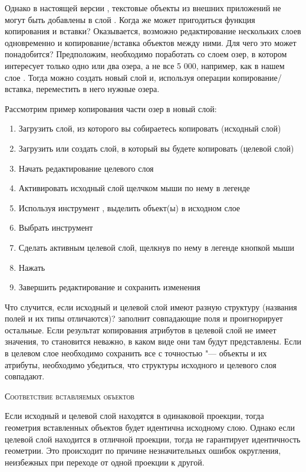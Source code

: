 Однако в настоящей версии  \qg, текстовые объекты из внешних приложений
\qg не могут быть добавлены в слой \qg. Когда же может пригодиться функция
копирования и вставки? Оказывается, возможно редактирование нескольких
слоев одновременно и копирование/вставка объектов между ними. Для чего это
может понадобится? Предположим, необходимо поработать со слоем озер, в
котором интересует только одно или два озера, а не все 5 000, например,
как в нашем слое . Тогда можно создать новый слой и,
используя операции копирование/вставка, переместить в него нужные озера.

Рассмотрим пример копирования части озер в новый слой:

\begin{enumerate}
\item Загрузить слой, из которого вы собираетесь копировать (исходный слой)
\item Загрузить или создать слой, в который вы будете копировать (целевой слой)
\item Начать редактирование целевого слоя
\item Активировать исходный слой щелчком мыши по нему в легенде
\item Используя инструмент ,
выделить объект(ы) в исходном слое
\item Выбрать инструмент 
\item Сделать активным целевой слой, щелкнув по нему в легенде кнопкой мыши
\item Нажать 
\item Завершить редактирование и сохранить изменения
\end{enumerate}

Что случится, если исходный и целевой слой имеют разную структуру (названия
полей и их типы отличаются)? \qg заполнит совпадающие поля и проигнорирует
остальные. Если результат копирования атрибутов в целевой слой не имеет
значения, то становится неважно, в каком виде они там будут представлены.
Если в целевом слое необходимо сохранить все с точностью "--- объекты и
их атрибуты, необходимо убедиться, что структуры исходного и целевого слоя
совпадают.

\begin{Tip}\caption{\textsc{Соответствие вставляемых объектов}}
Если исходный и целевой слой находятся в одинаковой проекции, тогда
геометрия вставленных объектов будет идентична исходному слою. Однако если
целевой слой находится в отличной проекции, тогда \qg не гарантирует
идентичность геометрии. Это происходит по причине незначительных ошибок
округления, неизбежных при переходе от одной проекции к другой.
\end{Tip}

